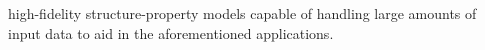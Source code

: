 \documentclass[final,twocolumn,12pt]{elsarticle}
\begin{document}
high-fidelity structure-property models capable of handling large amounts of input data to aid in the aforementioned applications.
	
	
	
	
\end{document}
